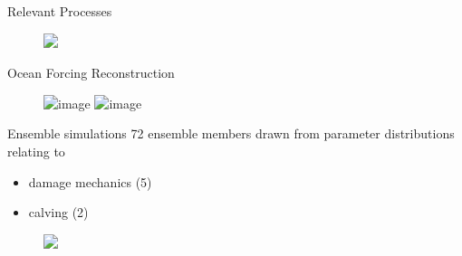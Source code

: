 \documentclass[hide notes,intlimits]{beamer}
\begin{document}
  
\begin{frame}{Relevant Processes}
      \begin{figure}
        \includegraphics<1>[width=\textwidth]{jib-setup-processes}
      \end{figure}
\end{frame}



  {
}
  


\begin{frame}
\end{frame}

  {
}

\begin{frame}{Ocean Forcing Reconstruction}
      \begin{figure}
        \includegraphics<1>[height=0.8\textheight]{jib_ocean_observation_categorical_1980_2020}
        \includegraphics<2>[height=0.8\textheight]{jib_ocean_forcing_1980_2020_normalized}
      \end{figure}
\end{frame}

  
  \begin{frame}{Ensemble simulations}
    72 ensemble members drawn from parameter distributions relating to
  \begin{itemize}
  \item damage mechanics (5)
  \item calving (2)
  \end{itemize}
      \begin{figure}
        \includegraphics<1>[width=\textwidth]{jib-setup}
      \end{figure}
\end{frame}
\end{document}

